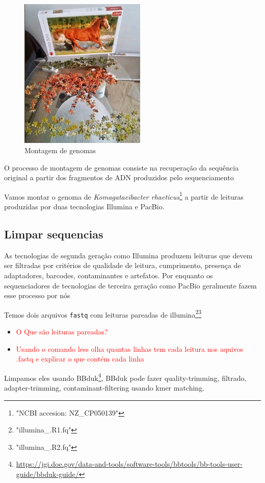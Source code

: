 \documentclass[letter,11pt]{book}
\begin{document}
\begin{figure}[h!]
\centering
 \includegraphics[width=6cm]{Figs/montagem_de_genoma.jpeg}
 \caption{\label{fig:fastqc}Montagem de genomas}
\end{figure}


O processo de montagem de genomas consiste na recuperação da sequência original a partir dos fragmentos de ADN produzidos pelo sequenciamento

Vamos montar o genoma de \emph{Komagataeibacter rhaeticus}\footnote{"NCBI accesion: NZ\_CP050139"} a partir de leituras produzidas por duas tecnologias Illumina e PacBio.

\subsection{Limpar sequencias}
As tecnologias de segunda geração como Illumina produzem leituras que devem ser filtradas por critérios de qualidade de leitura, cumprimento, presença de adaptadores, barcodes, contaminantes e artefatos.
Por enquanto os sequenciadores de tecnologias de terceira geração como PacBio geralmente fazem esse processo por nós

Temos dois arquivos \Verb+fastq+ com leituras pareadas de illumina\footnote{"illumina\_.R1.fq"}\footnote{"illumina\_.R2.fq"}

\begin{itemize}
\item \textcolor{red}{O Que são leituras pareadas?}
\item \textcolor{red}{Usando o comando less olha quantas linhas tem cada leitura nos aquivos .fastq e explicar o que contém cada linha}
\end{itemize}


Limpamos eles usando BBduk\footnote{\url{https://jgi.doe.gov/data-and-tools/software-tools/bbtools/bb-tools-user-guide/bbduk-guide/}}, BBduk pode fazer quality-trimming, filtrado, adapter-trimming, contaminant-filtering usando kmer matching.
\end{document}
